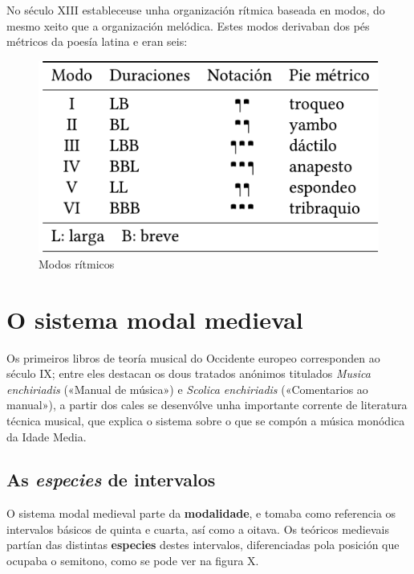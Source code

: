 \documentclass[a4paper, twoside]{templates/ociamthesis}
\begin{document}
No século XIII estableceuse unha organización rítmica baseada en modos, do mesmo xeito que a organización melódica. Estes modos derivaban dos pés métricos da poesía latina e eran seis:

\begin{figure}
\centering
\includegraphics{figures/ud-03/modosritmicos.png}
\caption{Modos rítmicos}
\end{figure}

\hypertarget{o-sistema-modal-medieval}{%
\section{O sistema modal medieval}\label{o-sistema-modal-medieval}}

Os primeiros libros de teoría musical do Occidente europeo corresponden ao século IX; entre eles destacan os dous tratados anónimos titulados \emph{Musica enchiriadis} («Manual de música») e \emph{Scolica enchiriadis} («Comentarios ao manual»), a partir dos cales se desenvólve unha importante corrente de literatura técnica musical, que explica o sistema sobre o que se compón a música monódica da Idade Media.

\hypertarget{as-especies-de-intervalos}{%
\subsection{\texorpdfstring{As \emph{especies} de intervalos}{As especies de intervalos}}\label{as-especies-de-intervalos}}

O sistema modal medieval parte da \textbf{modalidade}, e tomaba como referencia os intervalos básicos de quinta e cuarta, así como a oitava. Os teóricos medievais partían das distintas \textbf{especies} destes intervalos, diferenciadas pola posición que ocupaba o semitono, como se pode ver na figura X.
\end{document}
